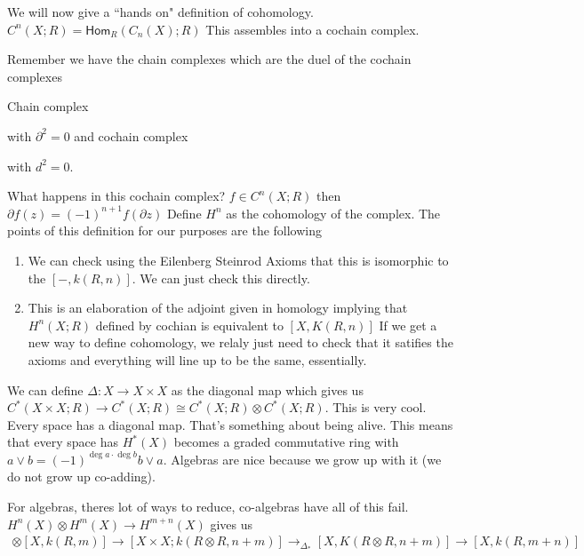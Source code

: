 \documentclass[10pt]{article}
\theoremstyle{definition}
\begin{document}
	We will now give a ``hands on" definition of cohomology. $C^n(X;R)=\mathsf{Hom}_R(C_n(X);R)$ This assembles into a cochain complex. 
	
	Remember we have the chain complexes which are the duel of the cochain complexes\begin{center} Chain complex
		with $\partial^2=0$ and cochain complex 
		with $d^2=0$. 
	\end{center}
	What happens in this cochain complex? $f\in C^n(X;R)$ then $\partial f(z)=(-1)^{n+1}f(\partial z)$ Define $H^n$ as the cohomology of the complex. The points of this definition for our purposes are the following\begin{enumerate}
		\item We can check using the Eilenberg Steinrod Axioms that this is isomorphic to the $[-,k(R,n)]$. We can just check this directly.
		\item This is an elaboration of the adjoint given in homology implying that $H^n(X;R)$ defined by cochian is equivalent to $[X,K(R,n)]$ If we get a new way to define cohomology, we relaly just need to check that it satifies the axioms and everything will line up to be the same, essentially. 
	\end{enumerate}
	We can define $\Delta:X\to X\times X$ as the diagonal map which gives us $C^\ast(X\times X; R)\to C^\ast(X;R)\cong C^\ast(X;R)\otimes C^\ast (X;R)$. This is very cool. Every space has a diagonal map. That's something about being alive. This means that every space has $H^*(X)$ becomes a graded commutative ring with $a\vee b=(-1)^{\deg a\cdot \deg b} b\vee a$. Algebras are nice because we grow up with it (we do not grow up co-adding). 
	
	For algebras, theres lot of ways to reduce, co-algebras have all of this fail. $H^n(X)\otimes H^m(X)\to H^{m+n}(X)$ gives us \begin{align*}
	[X,k(R,n)]\otimes [X,k(R,m)]\to [X\times X; k(R\otimes R,n+m)]\to_{\Delta_\ast} [X,K(R\otimes R, n+m)]\to [X,k(R,m+n)]
	\end{align*}
\end{document}
